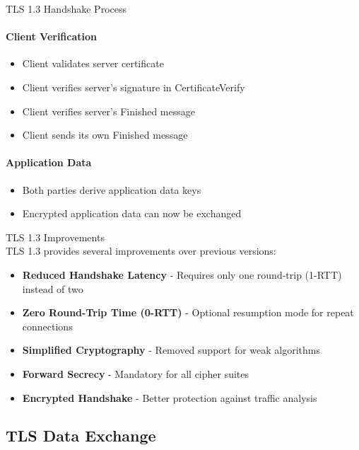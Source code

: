 \begin{KR}{TLS 1.3 Handshake Process}
\paragraph{Client Verification}
\begin{itemize}
    \item Client validates server certificate
    \item Client verifies server's signature in CertificateVerify
    \item Client verifies server's Finished message
    \item Client sends its own Finished message
\end{itemize}

\paragraph{Application Data}
\begin{itemize}
    \item Both parties derive application data keys
    \item Encrypted application data can now be exchanged
\end{itemize}
\end{KR}

\begin{lemma}{TLS 1.3 Improvements}\\
TLS 1.3 provides several improvements over previous versions:
\begin{itemize}
    \item \textbf{Reduced Handshake Latency} - Requires only one round-trip (1-RTT) instead of two
    \item \textbf{Zero Round-Trip Time (0-RTT)} - Optional resumption mode for repeat connections
    \item \textbf{Simplified Cryptography} - Removed support for weak algorithms
    \item \textbf{Forward Secrecy} - Mandatory for all cipher suites
    \item \textbf{Encrypted Handshake} - Better protection against traffic analysis
\end{itemize}
\end{lemma}

\subsection{TLS Data Exchange}

